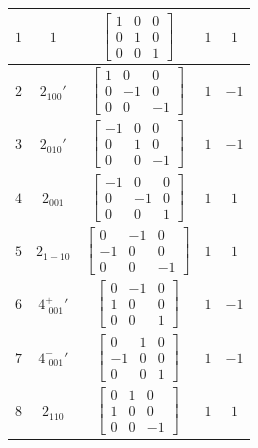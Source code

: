 \documentclass[fleqn,8pt]{jsarticle}
\begin{document}
\begin{longtable}{ccccc}
$ 1 $ & $ 1 $ & $ \begin{bmatrix} 1 & 0 & 0 \\ 0 & 1 & 0 \\ 0 & 0 & 1 \end{bmatrix} $ & $ 1 $ & $ 1 $ \\ \hline
$ 2 $ & $ 2{}_{100}{}' $ & $ \begin{bmatrix} 1 & 0 & 0 \\ 0 & -1 & 0 \\ 0 & 0 & -1 \end{bmatrix} $ & $ 1 $ & $ -1 $ \\ \hline
$ 3 $ & $ 2{}_{010}{}' $ & $ \begin{bmatrix} -1 & 0 & 0 \\ 0 & 1 & 0 \\ 0 & 0 & -1 \end{bmatrix} $ & $ 1 $ & $ -1 $ \\ \hline
$ 4 $ & $ 2{}_{001} $ & $ \begin{bmatrix} -1 & 0 & 0 \\ 0 & -1 & 0 \\ 0 & 0 & 1 \end{bmatrix} $ & $ 1 $ & $ 1 $ \\ \hline
$ 5 $ & $ 2{}_{1-10} $ & $ \begin{bmatrix} 0 & -1 & 0 \\ -1 & 0 & 0 \\ 0 & 0 & -1 \end{bmatrix} $ & $ 1 $ & $ 1 $ \\ \hline
$ 6 $ & $ 4^{+}_{\,\,001}{}' $ & $ \begin{bmatrix} 0 & -1 & 0 \\ 1 & 0 & 0 \\ 0 & 0 & 1 \end{bmatrix} $ & $ 1 $ & $ -1 $ \\ \hline
$ 7 $ & $ 4^{-}_{\,\,001}{}' $ & $ \begin{bmatrix} 0 & 1 & 0 \\ -1 & 0 & 0 \\ 0 & 0 & 1 \end{bmatrix} $ & $ 1 $ & $ -1 $ \\ \hline
$ 8 $ & $ 2{}_{110} $ & $ \begin{bmatrix} 0 & 1 & 0 \\ 1 & 0 & 0 \\ 0 & 0 & -1 \end{bmatrix} $ & $ 1 $ & $ 1 $ \\
\end{longtable}
\end{document}
